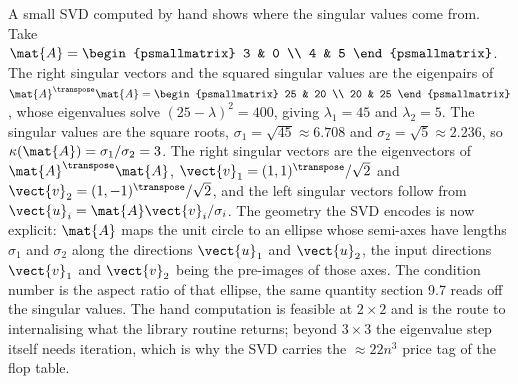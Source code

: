 \begin{mastery}
A small SVD computed by hand shows where the singular values come
from. Take $\mat{A} = \begin{psmallmatrix} 3 & 0 \\ 4 & 5
\end{psmallmatrix}$. The right singular vectors and the squared
singular values are the eigenpairs of $\mat{A}^{\transpose}\mat{A} =
\begin{psmallmatrix} 25 & 20 \\ 20 & 25 \end{psmallmatrix}$, whose
eigenvalues solve $(25 - \lambda)^{2} = 400$, giving $\lambda_{1} =
45$ and $\lambda_{2} = 5$. The singular values are the square roots,
$\sigma_{1} = \sqrt{45} \approx 6.708$ and $\sigma_{2} = \sqrt{5}
\approx 2.236$, so $\kappa(\mat{A}) = \sigma_{1}/\sigma_{2} = 3$. The
right singular vectors are the eigenvectors of
$\mat{A}^{\transpose}\mat{A}$, $\vect{v}_{1} = (1, 1)^{\transpose}/
\sqrt{2}$ and $\vect{v}_{2} = (1, -1)^{\transpose}/\sqrt{2}$, and the
left singular vectors follow from $\vect{u}_{i} = \mat{A}\vect{v}_{i}/
\sigma_{i}$. The geometry the SVD encodes is now explicit: $\mat{A}$
maps the unit circle to an ellipse whose semi-axes have lengths
$\sigma_{1}$ and $\sigma_{2}$ along the directions $\vect{u}_{1}$ and
$\vect{u}_{2}$, the input directions $\vect{v}_{1}$ and $\vect{v}_{2}$
being the pre-images of those axes. The condition number is the
aspect ratio of that ellipse, the same quantity section 9.7 reads off
the singular values. The hand computation is feasible at $2 \times 2$
and is the route to internalising what the library routine returns;
beyond $3 \times 3$ the eigenvalue step itself needs iteration, which
is why the SVD carries the $\approx 22 n^{3}$ price tag of the flop
table.
\end{mastery}

